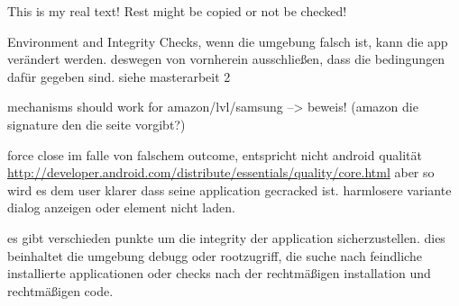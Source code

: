 This is my real text! Rest might be copied or not be checked!


Environment and Integrity Checks, wenn die umgebung falsch ist, kann die app verändert werden. deswegen von vornherein ausschließen, dass die bedingungen dafür gegeben sind.\newline
siehe masterarbeit 2\newline

mechanisms should work for amazon/lvl/samsung --> beweis! (amazon die signature den die seite vorgibt?)\newline

force close im falle von falschem outcome, entspricht nicht android qualität
\url{http://developer.android.com/distribute/essentials/quality/core.html} aber so wird es dem user klarer dass seine application gecracked ist. harmlosere variante dialog anzeigen oder element nicht laden.

es gibt verschieden punkte um die integrity der application sicherzustellen. dies beinhaltet die umgebung debugg oder rootzugriff, die suche nach feindliche installierte applicationen oder checks nach der rechtmäßigen installation und rechtmäßigen code.\newline
